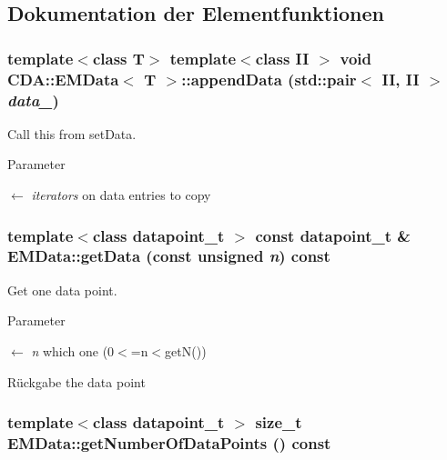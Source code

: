 \subsection{Dokumentation der Elementfunktionen}
\hypertarget{classCDA_1_1EMData_aeb4dcfb6c410636f5f88a9cbcbda407c}{
\subsubsection[{appendData}]{\setlength{\rightskip}{0pt plus 5cm}template$<$class T$>$ template$<$class II $>$ void {\bf CDA::EMData}$<$ T $>$::appendData (std::pair$<$ II, II $>$ {\em data\_\-})}}
\label{classCDA_1_1EMData_aeb4dcfb6c410636f5f88a9cbcbda407c}


Call this from setData. 


\begin{DoxyParams}{Parameter}
\item[\mbox{$\leftarrow$} {\em iterators}]on data entries to copy \end{DoxyParams}
\hypertarget{classCDA_1_1EMData_a750090eb9d6bc95f5ca58d502dd9c455}{
\subsubsection[{getData}]{\setlength{\rightskip}{0pt plus 5cm}template$<$class datapoint\_\-t $>$ const {\bf datapoint\_\-t} \& EMData::getData (const unsigned {\em n}) const}}
\label{classCDA_1_1EMData_a750090eb9d6bc95f5ca58d502dd9c455}


Get one data point. 


\begin{DoxyParams}{Parameter}
\item[\mbox{$\leftarrow$} {\em n}]which one (0$<$=n$<$getN())\end{DoxyParams}
\begin{DoxyReturn}{Rückgabe}
the data point 
\end{DoxyReturn}
\hypertarget{classCDA_1_1EMData_a9017a2d49d784e6bf0da22a1ef533496}{
\subsubsection[{getNumberOfDataPoints}]{\setlength{\rightskip}{0pt plus 5cm}template$<$class datapoint\_\-t $>$ size\_\-t EMData::getNumberOfDataPoints () const}}
\label{classCDA_1_1EMData_a9017a2d49d784e6bf0da22a1ef533496}


